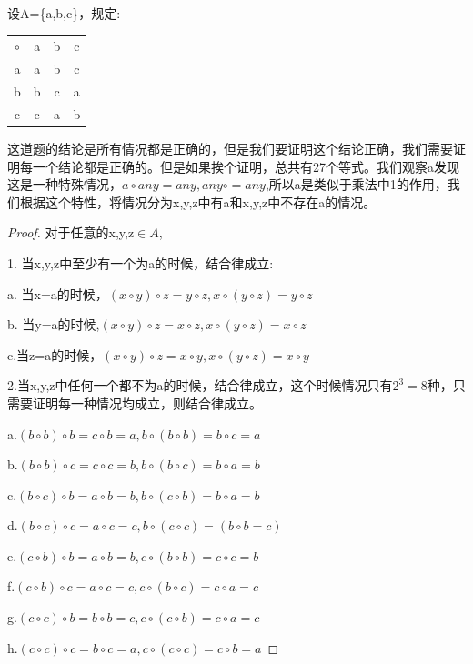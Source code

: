 \documentclass[
	11pt, %
	fleqn, %
	a4paper, %
]{LegrandOrangeBook}
\begin{document}
\begin{example}
	设A=\{a,b,c\}，规定:
	\begin{center}
		\begin{table}[H]
			\centering
			\begin{tabular}{|c|c|c|c|}
				\cline{1-4}
				$\circ$ & a & b & c \\ \cline{1-4}
				a       & a & b & c \\ \cline{1-4}
				b       & b & c & a \\ \cline{1-4}
				c       & c & a & b \\ \cline{1-4}
			\end{tabular}
		\end{table}
	\end{center}
	这道题的结论是所有情况都是正确的，但是我们要证明这个结论正确，我们需要证明每一个结论都是正确的。但是如果挨个证明，总共有27个等式。我们观察a发现这是一种特殊情况，$a\circ any=any,any\circ=any$,所以a是类似于乘法中1的作用，我们根据这个特性，将情况分为x,y,z中有a和x,y,z中不存在a的情况。
	\begin{proof}
		对于任意的x,y,z$\in A$,

		1. 当x,y,z中至少有一个为a的时候，结合律成立:

		a. 当x=a的时候，$(x\circ y)\circ z=y\circ z,x\circ(y\circ z)=y\circ z$

		b. 当y=a的时候,$(x\circ y)\circ z=x\circ z,x\circ(y\circ z)=x\circ z$

		c.当z=a的时候，$(x\circ y)\circ z=x\circ y,x\circ(y\circ z)=x\circ y$

		2.当x,y,z中任何一个都不为a的时候，结合律成立，这个时候情况只有$2^3=8种$，只需要证明每一种情况均成立，则结合律成立。

		a.$(b\circ b)\circ b=c\circ b=a,b\circ(b\circ b)=b\circ c=a$

		b.$(b\circ b)\circ c=c\circ c=b,b\circ(b\circ c)=b\circ a=b$

		c.$(b\circ c)\circ b=a\circ b=b,b\circ(c\circ b)=b\circ a=b$

		d.$(b\circ c)\circ c=a\circ c=c,b\circ(c\circ c)=(b\circ b=c)$

		e.$(c\circ b)\circ b=a\circ b=b,c\circ(b\circ b)=c\circ c=b$

		f.$(c\circ b)\circ c=a\circ c=c,c\circ (b\circ c)=c\circ a=c$

		g.$(c\circ c)\circ b=b\circ b=c,c\circ (c\circ b)=c\circ a=c$

		h.$(c\circ c)\circ c=b\circ c=a,c\circ (c\circ c)=c\circ b=a$
	\end{proof}
\end{example}
\end{document}
